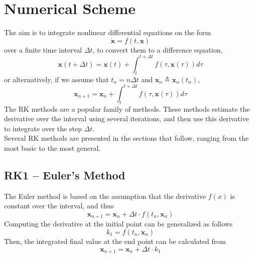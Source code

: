 \section{Numerical Scheme}
The aim is to integrate nonlinear differential equations on the form 
\begin{equation}
 \mathbf{\dot{x}} = f(t, \mathbf{x})   
\end{equation}
over a finite time interval $\Delta t$, to convert them to a difference equation, 
\begin{equation}
\mathbf{x}(t+\Delta t)=\mathbf{x}(t)+\int_{t}^{t+\Delta t} f(\tau, \mathbf{x}(\tau)) d \tau    
\end{equation}   
or alternatively, if we assume that $t_n=n \Delta t$ and $\mathbf{x}_n \triangleq  \mathbf{x}_{n}(t_n)$,
\begin{equation}
\mathbf{x}_{n+1}=\mathbf{x}_{n}+\int_{t}^{t+\Delta t} f(\tau, \mathbf{x}(\tau)) d \tau    
\end{equation}   
The RK methods are a popular family of methods. These methods estimate the derivative over the interval using several iterations, and then use this derivative to integrate over the step $\Delta t$.\\
Several RK methods are presented in the sections that follow, ranging from the most basic to the most general.

\subsection{RK1 -- Euler's Method}
The Euler method is based on the assumption that the derivative $f(x)$ is constant over the interval, and thus
\begin{equation}
\mathbf{x}_{n+1}=\mathbf{x}_{n}+\Delta t \cdot f(t_n,\mathbf{x}_n)
\end{equation} 
Computing the derivative at the initial point can be generalized as follows
\begin{equation}
    k_1 = f(t_n, \mathbf{x}_n)
\end{equation}
Then, the integrated final value at the end point can be calculated from
\begin{equation}
\mathbf{x}_{n+1}=\mathbf{x}_{n}+\Delta t \cdot k_1
\end{equation} 

